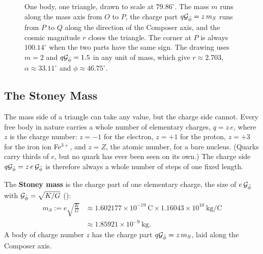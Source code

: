 \begin{figure}[tb]
\myfloatalign

\caption[One body, one triangle]{One body, one triangle, drawn to scale at $79.86^\circ$. The mass $m$ runs along the mass axis from $O$ to $P$, the charge part $q\mathcal{G}_{\bar{\phi}} = z\,m_S$ runs from $P$ to $Q$ along the direction of the Composer axis, and the cosmic magnitude $r$ closes the triangle. The corner at $P$ is always $100.14^\circ$ when the two parts have the same sign. The drawing uses $m = 2$ and $q\mathcal{G}_{\bar{\phi}} = 1.5$ in any unit of mass, which give $r \approx 2.703$, $\alpha \approx 33.11^\circ$ and $\phi \approx 46.75^\circ$.}
\label{fig:sm-triangle}
\end{figure}

\subsection{The Stoney Mass}\label{subsec:sm-stoney}

The mass side of a triangle can take any value, but the charge side cannot. Every free body in nature carries a whole number of elementary charges, $q = z\,e$, where $z$ is the charge number: $z = -1$ for the electron, $z = +1$ for the proton, $z = +3$ for the iron ion Fe$^{3+}$, and $z = Z$, the atomic number, for a bare nucleus. (Quarks carry thirds of $e$, but no quark has ever been seen on its own.) The charge side $q\mathcal{G}_{\bar{\phi}} = z\,e\,\mathcal{G}_{\bar{\phi}}$ is therefore always a whole number of steps of one fixed length.

\begin{definition}\label{def:stoney-mass}
The \textbf{Stoney mass} is the charge part of one elementary charge, the size of $e\,\mathcal{G}_{\bar{\phi}}$ with $\mathcal{G}_{\bar{\phi}} = \sqrt{K/G}$ ():
\begin{align*}
m_S := e\sqrt{\frac{K}{G}} &\approx 1.602177 \times 10^{-19}\ \mathrm{C} \times 1.16043 \times 10^{10}\ \mathrm{kg/C} \\
&\approx 1.85921 \times 10^{-9}\ \mathrm{kg}.
\end{align*}
A body of charge number $z$ has the charge part $q\mathcal{G}_{\bar{\phi}} = z\,m_S$, laid along the Composer axis.
\end{definition}

